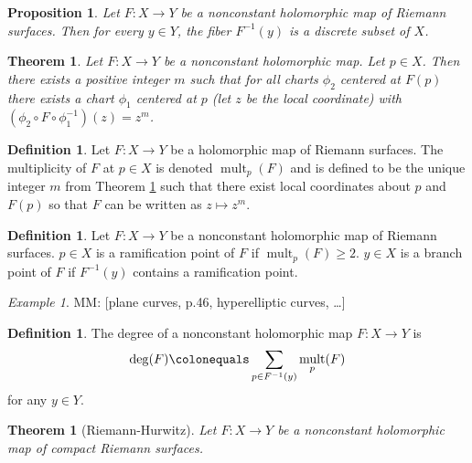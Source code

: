 \documentclass{dcthesis}
\newcommand{\defi}[1]{\textsf{#1}}
\newcommand{\mm}[1]{{\color{blue} \sf MM: [#1]}}
\DeclareMathOperator{\mult}{mult}
\numberwithin{equation}{section}
\newtheorem{theorem}[equation]{Theorem}
\newtheorem{prop}[equation]{Proposition}
\theoremstyle{definition}
\newtheorem{definition}[equation]{Definition}
\theoremstyle{remark}
\newtheorem{example}[equation]{Example}
\begin{document}
{{\begin{prop}
      \label{prop:discretefibers}
      Let $F\colon X\to Y$ be a nonconstant
      holomorphic map of Riemann surfaces.
      Then for every $y\in Y$,
      the fiber $F^{-1}(y)$ is a discrete subset of $X$.
    \end{prop}
    \begin{theorem}
      \label{thm:localnormalform}
      Let $F\colon X\to Y$ be a nonconstant holomorphic map.
      Let $p\in X$.
      Then there exists a positive integer $m$ such that
      for all charts
      $\phi_2$ centered at $F(p)$
      there exists a chart $\phi_1$ centered at $p$
      (let $z$ be the local coordinate)
      with $(\phi_2\circ F\circ\phi_1^{-1})(z) = z^m$.
    \end{theorem}
    \begin{definition}
      \label{def:multiplicity}
      Let $F\colon X\to Y$ be a holomorphic map
      of Riemann surfaces.
      The \defi{multiplicity}
      of $F$ at $p\in X$ is denoted
      $\mult_p(F)$ and is defined to be the unique
      integer $m$ from Theorem \ref{thm:localnormalform}
      such that there exist local coordinates about $p$
      and $F(p)$ so that
      $F$ can be written as $z\mapsto z^m$.
    \end{definition}
    \begin{definition}
      \label{def:ramificationRS}
      Let $F\colon X\to Y$ be a nonconstant holomorphic
      map of Riemann surfaces.
      $p\in X$ is a \defi{ramification point}
      of $F$
      if $\mult_p(F)\geq 2$.
      $y\in X$ is a \defi{branch point} of $F$
      if $F^{-1}(y)$ contains a ramification point.
    \end{definition}
    \begin{example}
      \label{exm:planecurve}
      \mm{plane curves, p.46, hyperelliptic curves, \ldots}
    \end{example}
    \begin{definition}
      \label{def:degreemapofRS}
      The \defi{degree}
      of a nonconstant holomorphic map
      $F\colon X\to Y$
      is
      \[
        \deg(F) \colonequals
        \sum_{p\in F^{-1}(y)}\mult_p(F)
      \]
      for any $y\in Y$.
    \end{definition}
    \begin{theorem}[Riemann-Hurwitz]
      \label{thm:riemannhurwitzforriemannsurfaces}
      Let $F\colon X\to Y$
      be a nonconstant holomorphic map of
      compact Riemann surfaces.

\end{theorem}}}
\end{document}
